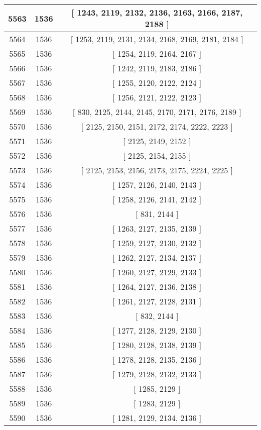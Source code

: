 \begin{center}
\begin{longtable}[H]{|| c c c ||}
\hline
5563 & 1536 & [ 1243, 2119, 2132, 2136, 2163, 2166, 2187, 2188 ] \\ 
\hline
5564 & 1536 & [ 1253, 2119, 2131, 2134, 2168, 2169, 2181, 2184 ] \\ 
\hline
5565 & 1536 & [ 1254, 2119, 2164, 2167 ] \\ 
\hline
5566 & 1536 & [ 1242, 2119, 2183, 2186 ] \\ 
\hline
5567 & 1536 & [ 1255, 2120, 2122, 2124 ] \\ 
\hline
5568 & 1536 & [ 1256, 2121, 2122, 2123 ] \\ 
\hline
5569 & 1536 & [ 830, 2125, 2144, 2145, 2170, 2171, 2176, 2189 ] \\ 
\hline
5570 & 1536 & [ 2125, 2150, 2151, 2172, 2174, 2222, 2223 ] \\ 
\hline
5571 & 1536 & [ 2125, 2149, 2152 ] \\ 
\hline
5572 & 1536 & [ 2125, 2154, 2155 ] \\ 
\hline
5573 & 1536 & [ 2125, 2153, 2156, 2173, 2175, 2224, 2225 ] \\ 
\hline
5574 & 1536 & [ 1257, 2126, 2140, 2143 ] \\ 
\hline
5575 & 1536 & [ 1258, 2126, 2141, 2142 ] \\ 
\hline
5576 & 1536 & [ 831, 2144 ] \\ 
\hline
5577 & 1536 & [ 1263, 2127, 2135, 2139 ] \\ 
\hline
5578 & 1536 & [ 1259, 2127, 2130, 2132 ] \\ 
\hline
5579 & 1536 & [ 1262, 2127, 2134, 2137 ] \\ 
\hline
5580 & 1536 & [ 1260, 2127, 2129, 2133 ] \\ 
\hline
5581 & 1536 & [ 1264, 2127, 2136, 2138 ] \\ 
\hline
5582 & 1536 & [ 1261, 2127, 2128, 2131 ] \\ 
\hline
5583 & 1536 & [ 832, 2144 ] \\ 
\hline
5584 & 1536 & [ 1277, 2128, 2129, 2130 ] \\ 
\hline
5585 & 1536 & [ 1280, 2128, 2138, 2139 ] \\ 
\hline
5586 & 1536 & [ 1278, 2128, 2135, 2136 ] \\ 
\hline
5587 & 1536 & [ 1279, 2128, 2132, 2133 ] \\ 
\hline
5588 & 1536 & [ 1285, 2129 ] \\ 
\hline
5589 & 1536 & [ 1283, 2129 ] \\ 
\hline
5590 & 1536 & [ 1281, 2129, 2134, 2136 ] \\ 

\end{longtable}
\end{center}
